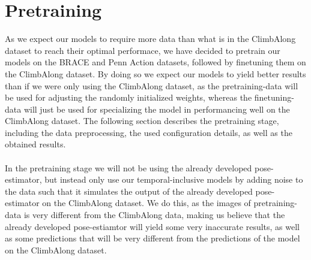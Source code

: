 \documentclass[./main.tex]{subfiles}
\begin{document}
\section{Pretraining}
\label{sec:pretraining}
As we expect our models to require more data than what is in the ClimbAlong dataset to reach their optimal performace, we have decided to pretrain our models on the BRACE and Penn Action datasets, followed by finetuning them on the ClimbAlong dataset. By doing so we expect our models to yield better results than if we were only using the ClimbAlong dataset, as the pretraining-data will be used for adjusting the randomly initialized weights, whereas the finetuning-data will just be used for specializing the model in performancing well on the ClimbAlong dataset. The following section describes the pretraining stage, including the data preprocessing, the used configuration details, as well as the obtained results.
\\
\\
In the pretraining stage we will not be using the already developed pose-estimator, but instead only use our temporal-inclusive models by adding noise to the data such that it simulates the output of the already developed pose-estimator on the ClimbAlong dataset. We do this, as the images of pretraining-data is very different from the ClimbAlong data, making us believe that the already developed pose-estiamtor will yield some very inaccurate results, as well as some predictions that will be very different from the predictions of the model on the ClimbAlong dataset.
\end{document}
